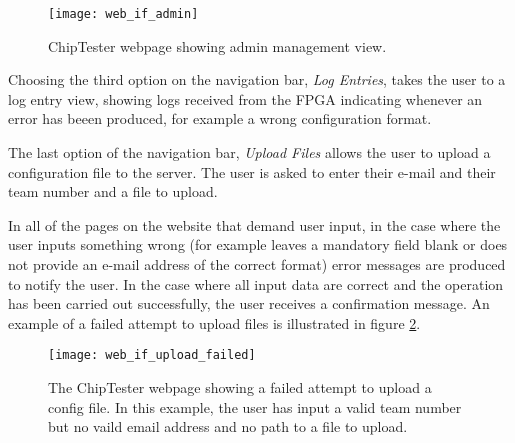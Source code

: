 \begin{figure}[ht]
 \centering
 \texttt{[image: web\_if\_admin]}
 \caption{ChipTester webpage showing admin management view.}
 \label{fig:web_if_admin}
\end{figure}

Choosing the third option on the navigation bar, \textit{Log Entries}, takes the user to a log entry view, showing logs received from the FPGA indicating whenever an error has beeen produced, for example a wrong configuration format.

The last option of the navigation bar, \textit{Upload Files} allows the user to upload a configuration file to the server. The user is asked to enter their e-mail and their team number and a file to upload.

In all of the pages on the website that demand user input, in the case where the user inputs something wrong (for example leaves a mandatory field blank or does not provide an e-mail address of the correct format) error messages are produced to notify the user. In the case where all input data are correct and the operation has been carried out successfully, the user receives a confirmation message. An example of a failed attempt to upload files is illustrated in figure \ref{fig:web_if_upload_failed}.

\begin{figure}[ht]
 \centering
 \texttt{[image: web\_if\_upload\_failed]}
 \caption{The ChipTester webpage showing a failed attempt to upload a config file. In this example, the user has input a valid team number but no vaild email address and no path to a file to upload.}
 \label{fig:web_if_upload_failed}
\end{figure}


